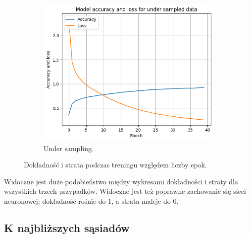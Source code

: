 \begin{figure}[H]
    \begin{subfigure}{.33\textwidth}
        \centering
        \includegraphics[width=\textwidth]{img/under_acc_loss.png}
        \caption{Under sampling.}
        \label{fig:accu_loss_under}
    \end{subfigure}
    \caption{Dokładność i strata podczas treningu względem liczby epok.}
\end{figure}
Widoczne jest duże podobieństwo między wykresami dokładności i straty dla wszystkich trzech przypadków.
Widoczne jest też poprawne zachowanie się sieci neuronowej: dokładność rośnie do 1, a strata maleje do 0.
\subsection{K najbliższych sąsiadów}\label{sec:k_najblizszych_sasiadow}
